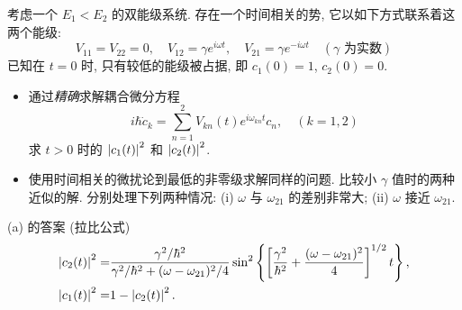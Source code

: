 \documentclass{assignment}
\begin{document}
\begin{prob}[课本习题 5.30]
    考虑一个 $E_1<E_2$ 的双能级系统. 存在一个时间相关的势, 它以如下方式联系着这两个能级:
    \[
        V_{11}=V_{22}=0,\quad V_{12}=\gamma e^{i\omega t},\quad V_{21}=\gamma e^{-i\omega t}\quad(\gamma\text{ 为实数})
    \]
    已知在 $t=0$ 时, 只有较低的能级被占据, 即 $c_1(0)=1$, $c_2(0)=0$.
    \begin{itemize}
        \item[(a)] 通过\textit{精确}求解耦合微分方程
        \[
            i\hbar\dot{c}_k=\sum_{n=1}^2V_{kn}(t)e^{i\omega_{kn}t}c_n,\quad(k=1,2)
        \]
        求 $t>0$ 时的 $\left\lvert c_1(t)\right\rvert^2$ 和 $\left\lvert c_2(t)\right\rvert^2$.
        \item[(b)] 使用时间相关的微扰论到最低的非零级求解同样的问题. 比较小 $\gamma$ 值时的两种近似的解. 分别处理下列两种情况: (i) $\omega$ 与 $\omega_{21}$ 的差别非常大; (ii) $\omega$ 接近 $\omega_{21}$.
    \end{itemize}

    (a) 的答案 (拉比公式)
    \begin{align*}
        \left\lvert c_2(t)\right\rvert^2=&\frac{\gamma^2/\hbar^2}{\gamma^2/\hbar^2+(\omega-\omega_{21})^2/4}\sin^2\left\{\left[\frac{\gamma^2}{\hbar^2}+\frac{(\omega-\omega_{21})^2}{4}\right]^{1/2}t\right\},\\
        \left\lvert c_1(t)\right\rvert^2=&1-\left\lvert c_2(t)\right\rvert^2.
    \end{align*}
\end{prob}
\end{document}
